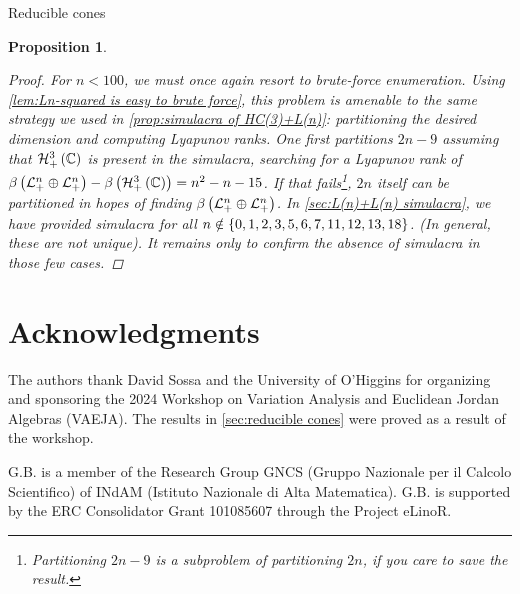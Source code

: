 \documentclass{interact}
\theoremstyle{plain}
\newtheorem{proposition}[theorem]{Proposition}
\theoremstyle{definition}
\theoremstyle{remark}
\begin{document}
\begin{section}{Reducible cones}
\begin{proposition}
\begin{proof}
        For $n < 100$, we must once again resort to brute-force
        enumeration. Using \cref{lem:Ln-squared is easy to brute
          force}, this problem is amenable to the same strategy we
        used in \cref{prop:simulacra of HC(3)+L(n)}: partitioning the
        desired dimension and computing Lyapunov ranks. One first
        partitions $2n-9$ assuming that $\Hnplus[3]\of{\Cn[1]}$ is
        present in the simulacra, searching for a Lyapunov rank of
        $\lyapunovrank{\directsum{\Lnplus}{\Lnplus}} -
        \lyapunovrank{\Hnplus[3]\of{\Cn[1]}} = n^{2} - n - 15$. If
        that fails\footnote{Partitioning $2n-9$ is a subproblem of
        partitioning $2n$, if you care to save the result.}, $2n$
        itself can be partitioned in hopes of finding
        $\beta\left({ {{\mathcal{L}^{{n}}_{+}}\oplus{ \mathcal{L}^{{n}}_{+} }} }\right)$. In
        \cref{sec:L(n)+L(n) simulacra}, we have provided simulacra for
        all $n \notin \left\lbrace{0,1,2,3,5,6,7,11,12,13,18}\right\rbrace$. (In general,
        these are not unique). It remains only to confirm the absence
        of simulacra in those few cases.
      \end{proof}
    \end{proposition}
  \end{section}

  \section*{Acknowledgments}{
    The authors thank David Sossa and the University of O'Higgins for
    organizing and sponsoring the 2024 Workshop on Variation Analysis
    and Euclidean Jordan Algebras (VAEJA). The results in
    \cref{sec:reducible cones} were proved as a result of the
    workshop.

    G.B. is a member of the Research Group GNCS (Gruppo Nazionale per
    il Calcolo Scientifico) of INdAM (Istituto Nazionale di Alta
    Matematica). G.B. is supported by the ERC Consolidator Grant
    101085607 through the Project eLinoR.
  }

  
  
\end{document}
